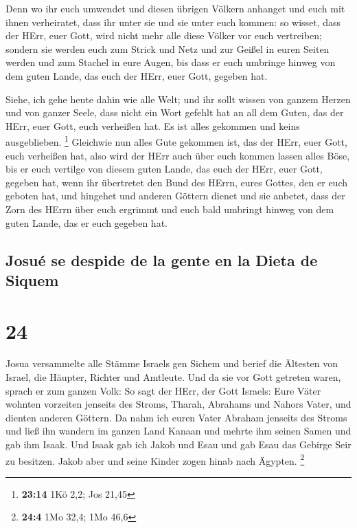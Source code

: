  Denn wo ihr euch umwendet und diesen übrigen Völkern
anhanget und euch mit ihnen verheiratet, dass ihr unter sie und sie
unter euch kommen:  so wisset, dass der HErr, euer Gott,
wird nicht mehr alle diese Völker vor euch vertreiben; sondern sie
werden euch zum Strick und Netz und zur Geißel in euren Seiten werden
und zum Stachel in eure Augen, bis dass er euch umbringe hinweg von dem
guten Lande, das euch der HErr, euer Gott, gegeben hat.

 Siehe, ich gehe heute dahin wie alle Welt; und ihr sollt
wissen von ganzem Herzen und von ganzer Seele, dass nicht ein Wort
gefehlt hat an all dem Guten, das der HErr, euer Gott, euch verheißen
hat. Es ist alles gekommen und keins ausgeblieben. \footnote{\textbf{23:14}
  1Kö 2,2; Jos 21,45}  Gleichwie nun alles Gute gekommen
ist, das der HErr, euer Gott, euch verheißen hat, also wird der HErr
auch über euch kommen lassen alles Böse, bis er euch vertilge von diesem
guten Lande, das euch der HErr, euer Gott, gegeben hat, 
wenn ihr übertretet den Bund des HErrn, eures Gottes, den er euch
geboten hat, und hingehet und anderen Göttern dienet und sie anbetet,
dass der Zorn des HErrn über euch ergrimmt und euch bald umbringt hinweg
von dem guten Lande, das er euch gegeben hat.

\hypertarget{josuuxe9-se-despide-de-la-gente-en-la-dieta-de-siquem}{%
\subsection{Josué se despide de la gente en la Dieta de
Siquem}\label{josuuxe9-se-despide-de-la-gente-en-la-dieta-de-siquem}}

\hypertarget{section-23}{%
\section{24}\label{section-23}}

 Josua versammelte alle Stämme Israels gen Sichem und
berief die Ältesten von Israel, die Häupter, Richter und Amtleute. Und
da sie vor Gott getreten waren,  sprach er zum ganzen
Volk: So sagt der HErr, der Gott Israels: Eure Väter wohnten vorzeiten
jenseits des Stroms, Tharah, Abrahams und Nahors Vater, und dienten
anderen Göttern.  Da nahm ich euren Vater Abraham jenseits
des Stroms und ließ ihn wandern im ganzen Land Kanaan und mehrte ihm
seinen Samen und gab ihm Isaak.  Und Isaak gab ich Jakob
und Esau und gab Esau das Gebirge Seir zu besitzen. Jakob aber und seine
Kinder zogen hinab nach Ägypten. \footnote{\textbf{24:4} 1Mo 32,4; 1Mo
  46,6}

